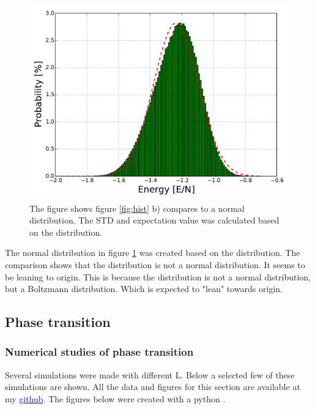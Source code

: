 \begin{figure}[H]
    \centering
    \includegraphics[width=0.6\linewidth]{result/bilder/hist/compared-hist}
    \caption{The figure shows figure \ref{fig:hist} b) compares to a normal distribution. The STD and expectation value was calculated based on the distribution.}
    \label{fig:hist-normal}
\end{figure}

The normal distribution in figure \ref{fig:hist-normal} was created based on the distribution. The comparison shows that the distribution is not a normal distribution. It seems to be leaning to origin. This is because the distribution is not a normal distribution, but a Boltzmann distribution. Which is expected to "lean" towards origin.





















\pagebreak
\subsection{Phase transition}



\subsubsection{Numerical studies of phase transition}

Several simulations were made with different L. Below a selected few of these simulations are shown. All the data and figures for this section are available at my \href{https://github.com/erikfsk/Project-4/tree/master/Project4/Result/4e/}{\textcolor{blue}{github}}. The figures below were created with a python \href{https://github.com/erikfsk/Project-4/blob/master/Project4/Result/4e/plot-4e.py}{\color{blue}{script}}.

